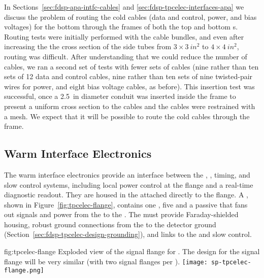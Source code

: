 In Sections~\ref{sec:fdsp-apa-intfc-cables} and \ref{sec:fdsp-tpcelec-interfaces-apa}
we discuss the problem of routing the cold cables (data and control, power, and 
bias voltages) for the bottom  through the frames of both
the top and bottom s. Routing tests were initially performed
with the  cable bundles, and even after increasing the 
the cross section of the side tubes from $\num{3}\times\SI{3}{in^2}$ 
to $\num{4}\times\SI{4}{in^2}$, routing was difficult. After understanding that we
could reduce the number of cables, we ran a second set of tests with fewer sets 
of cables (nine rather than ten sets of 12 data and control cables, nine rather than 
ten sets of nine twisted-pair wires for power, and eight bias voltage cables, as before).
This insertion test was successful, once
a \SI{2.5}{in} diameter conduit was inserted inside the 
 frame to present a uniform cross section to
the cables and the cables were restrained with a mesh. We expect that it will be possible
to route the cold cables through the  frame.

\subsection{Warm Interface Electronics}
\label{sec:fdsp-tpcelec-design-warm}

The warm interface electronics provide an interface between the 
, , timing, and slow control systems, including 
local power control at the flange and a real-time diagnostic readout. 
They are housed in the  attached directly to the  
flange.  %
A , shown in Figure~\ref{fig:tpcelec-flange}, 
contains one , %
 five %
 and a passive 
that fans out signals and  power from the  to the 
. The  must provide Faraday-shielded housing, 
robust ground connections from the  to the detector ground 
(Section~\ref{sec:fdsp-tpcelec-design-grounding}), and %
links to the  and slow control. %

\begin{dunefigure}
{fig:tpcelec-flange}
{Exploded view of the  signal flange for .  
The design for the   
signal flange will be very similar (with two  signal flanges per \fdth).}
\texttt{[image: sp-tpcelec-flange.png]}
\end{dunefigure}

